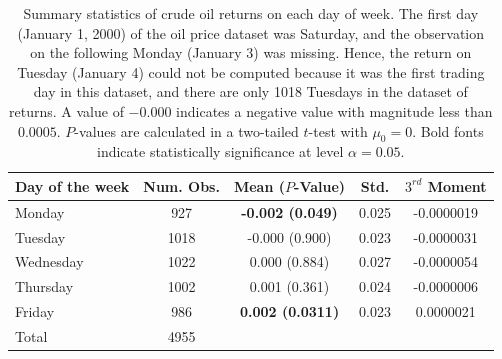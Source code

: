 \documentclass[12pt]{article}
\begin{document}
	\begin{table}[H]
		\small
		\centering
		\begin{tabular}{l|c c c c}
			\toprule
			Day of the week & Num. Obs. & Mean ($P$-Value) & Std. & $3^{rd}$ Moment \\
			\midrule
			Monday & 927 & \textbf{-0.002 (0.049)} & 0.025 & -0.0000019 \\
			Tuesday & 1018 & -0.000 (0.900) & 0.023 & -0.0000031 \\
			Wednesday & 1022 & 0.000 (0.884) & 0.027 & -0.0000054 \\
			Thursday & 1002 & 0.001 (0.361) & 0.024 & -0.0000006 \\
			Friday & 986 & \textbf{0.002 (0.0311)} & 0.023 & 0.0000021 \\
			\midrule
			Total & 4955 & & & \\
			\bottomrule
		\end{tabular}
		\caption{Summary statistics of crude oil returns on each day of week. The first day (January 1, 2000) of the oil price dataset was Saturday, and the observation on the following Monday (January 3) was missing. Hence, the return on Tuesday (January 4) could not be computed because it was the first trading day in this dataset, and there are only 1018 Tuesdays in the dataset of returns. A value of $-0.000$ indicates a negative value with magnitude less than $0.0005$. $P$-values are calculated in a two-tailed $t$-test with $\mu_0 = 0$. Bold fonts indicate statistically significance at level $\alpha=0.05$.}
	\end{table}
	
\end{document}
